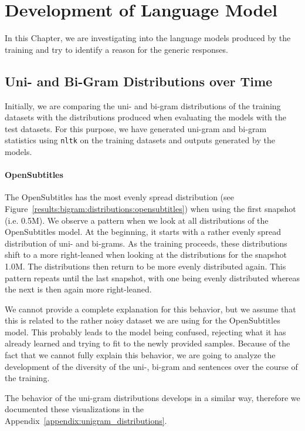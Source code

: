 \section{Development of Language Model}
\label{results:development_language_model}
In this Chapter, we are investigating into the language models produced by the training and try to identify a reason for the generic responses.

\subsection{Uni- and Bi-Gram Distributions over Time}
Initially, we are comparing the uni- and bi-gram distributions of the training datasets with the distributions produced when evaluating the models with the test datasets. For this purpose, we have generated uni-gram and bi-gram statistics using \texttt{nltk} on the training datasets and outputs generated by the models.

\paragraph{OpenSubtitles} The OpenSubtitles has the most evenly spread distribution (see Figure~\ref{results:bigram:distributions:opensubtitles}) when using the first snapshot (i.e. 0.5M). We observe a pattern when we look at all distributions of the OpenSubtitles model. At the beginning, it starts with a rather evenly spread distribution of uni- and bi-grams. As the training proceeds, these distributions shift to a more right-leaned when looking at the distributions for the snapshot 1.0M. The distributions then return to be more evenly distributed again. This pattern repeats until the last snapshot, with one being evenly distributed whereas the next is then again more right-leaned.

We cannot provide a complete explanation for this behavior, but we assume that this is related to the rather noisy dataset we are using for the OpenSubtitles model. This probably leads to the model being confused, rejecting what it has already learned and trying to fit to the newly provided samples. Because of the fact that we cannot fully explain this behavior, we are going to analyze the development of the diversity of the uni-, bi-gram and sentences over the course of the training.

The behavior of the uni-gram distributions develops in a similar way, therefore we documented these visualizations in the Appendix~\ref{appendix:unigram_distributions}.

